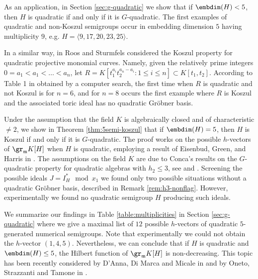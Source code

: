 \documentclass[12pt]{amsart}
\def\frk{\mathfrak}               %
\def\mm{{\frk m}}
\begin{document}
As an application, in Section \ref{sec:g-quadratic} we show that if $\embdim(H) <5$, then $H$ is quadratic if and only if it is $G$-quadratic.
The first examples of quadratic and non-Koszul semigroups occur in embedding dimension $5$ having  multiplicity $9$, e.g. $H=\langle 9, 17, 20, 23, 25 \rangle$. 


In a similar way, in \cite{Roos-Sturmfels} Roos and Sturmfels considered the Koszul property for quadratic projective monomial curves. Namely, given the relatively prime integers
$0=a_1<a_1<\dots <a_n$, let $R=K[t_1^{a_i}t_2^{a_n-a_i}:1\leq i \leq n] \subset K[t_1, t_2]$. 
According to Table 1 in \cite{Roos-Sturmfels} obtained by a computer search,  the first time when $R$ is quadratic and not Koszul is  for $n=6$, and for $n=8$ occurs 
the first example where $R$ is Koszul and  the associated toric ideal has no quadratic Gr\"obner basis.


Under the assumption that the field $K$ is algebraically closed and of characteristic $\neq 2$, we show in Theorem \ref{thm:5semi-koszul}
that if $\embdim(H)=5$, then $H$ is Koszul if and only if it is $G$-quadratic. 
The proof works on the possible $h$-vectors of $\gr_\mm K[H]$ when $H$ is quadratic, employing  a result of Eisenbud, Green, and Harris in \cite{EGH-highCastelnuovo}.
The assumptions on the field $K$ are due to   Conca's results on the $G$-quadratic property for quadratic algebras with $h_2 \leq 3$, 
see \cite{Conca-quadrics} and \cite{Conca-quadrics-codim3}. Screening the possible ideals $J=I_H^* \mod x_1$ we found only two possible
situations without a quadratic Gr\"obner basis, described in Remark \ref{rem:h3-nonflag}. However, experimentally we found no quadratic semigroup $H$ producing such ideals.

We summarize our findings in Table \ref{table:multiplicities} in Section \ref{sec:g-quadratic} 
where we give a maximal list of $12$ possible $h$-vectors of quadratic $5$-generated numerical semigroups. 
Note that experimentally we could not obtain the $h$-vector $(1,4,5)$. Nevertheless, we can conclude that if $H$ is quadratic and $\embdim(H) \leq 5$, the
Hilbert function of $\gr_\mm K[H]$ is non-decreasing. This   topic  has   been recently considered by D'Anna, Di Marca and Micale in \cite{dAdMM} and by
Oneto, Strazzanti and Tamone in \cite{OST}.



\end{document}

